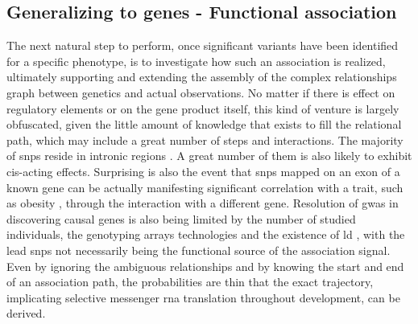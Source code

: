 \subsection{Generalizing to genes - Functional association}
The next natural step to perform, once significant variants have been identified for a specific phenotype, is to investigate how such an association is realized, ultimately supporting and extending the assembly of the complex relationships graph between genetics and actual observations. No matter if there is effect on regulatory elements or on the gene product itself, this kind of venture is largely obfuscated, given the little amount of knowledge that exists to fill the relational path, which may include a great number of steps and interactions. The majority of \acp{snp} reside in intronic regions \cite{Belmont2003}. A great number of them is also likely to exhibit cis-acting effects. Surprising is also the event that \acp{snp} mapped on an exon of a known gene can be actually manifesting significant correlation with a trait, such as obesity \cite{Claussnitzer2015}, through the interaction with a different gene. Resolution of \ac{gwas} in discovering causal genes is also being limited by the number of studied individuals, the genotyping arrays technologies and the existence of \ac{ld} \cite{Do2017}, with the lead \acp{snp} not necessarily being the functional source of the association signal. Even by ignoring the ambiguous relationships and by knowing the start and end of an association path, the probabilities are thin that the exact trajectory, implicating selective messenger \ac{rna} translation throughout development, can be derived. 

